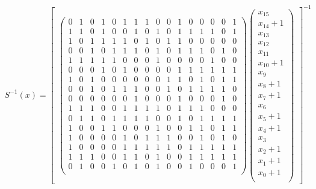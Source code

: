 \begin{align*}
S^{-1}(x) = 
\begin{bmatrix} 
\begin{pmatrix}
0 & 1 & 0 & 1 & 0 & 1 & 1 & 1 & 0 & 0 & 1 & 0 & 0 & 0 & 0 & 1 \\
1 & 1 & 0 & 1 & 0 & 0 & 1 & 0 & 1 & 0 & 1 & 1 & 1 & 1 & 0 & 1 \\
1 & 0 & 1 & 1 & 1 & 1 & 0 & 1 & 0 & 1 & 1 & 0 & 0 & 0 & 0 & 0 \\
0 & 0 & 1 & 0 & 1 & 1 & 1 & 0 & 1 & 0 & 1 & 1 & 1 & 0 & 1 & 0 \\
1 & 1 & 1 & 1 & 1 & 0 & 0 & 0 & 1 & 0 & 0 & 0 & 0 & 1 & 0 & 0 \\
0 & 0 & 0 & 1 & 0 & 1 & 0 & 0 & 0 & 0 & 1 & 1 & 1 & 1 & 1 & 1 \\
1 & 0 & 1 & 0 & 0 & 0 & 0 & 0 & 0 & 1 & 1 & 0 & 1 & 0 & 1 & 1 \\
0 & 0 & 1 & 0 & 1 & 1 & 1 & 0 & 0 & 1 & 0 & 1 & 1 & 1 & 1 & 0 \\
0 & 0 & 0 & 0 & 0 & 0 & 1 & 0 & 0 & 0 & 1 & 0 & 0 & 0 & 1 & 0 \\
1 & 1 & 1 & 0 & 0 & 1 & 1 & 1 & 1 & 0 & 1 & 1 & 1 & 0 & 0 & 0 \\
0 & 1 & 1 & 0 & 1 & 1 & 1 & 1 & 0 & 0 & 1 & 0 & 1 & 1 & 1 & 1 \\
1 & 0 & 0 & 1 & 1 & 0 & 0 & 0 & 1 & 0 & 0 & 1 & 1 & 0 & 1 & 1 \\
1 & 0 & 0 & 0 & 0 & 1 & 0 & 1 & 1 & 1 & 0 & 0 & 1 & 0 & 1 & 0 \\
1 & 0 & 0 & 0 & 0 & 1 & 1 & 1 & 1 & 1 & 0 & 1 & 1 & 1 & 1 & 1 \\
1 & 1 & 1 & 0 & 0 & 1 & 1 & 0 & 1 & 0 & 0 & 1 & 1 & 1 & 1 & 1 \\
0 & 1 & 0 & 0 & 1 & 0 & 1 & 0 & 1 & 0 & 0 & 1 & 0 & 0 & 0 & 1 \\
\end{pmatrix}
\begin{pmatrix}
x_{15} \\
x_{14} + 1 \\
x_{13} \\
x_{12} \\
x_{11} \\
x_{10} + 1 \\
x_{9} \\
x_{8} + 1 \\
x_{7} + 1 \\
x_{6} \\
x_{5} + 1 \\
x_{4} + 1 \\
x_{3} \\
x_{2} + 1 \\
x_{1} + 1 \\
x_{0} + 1 \\
\end{pmatrix}
\end{bmatrix}^{-1}
\end{align*}

